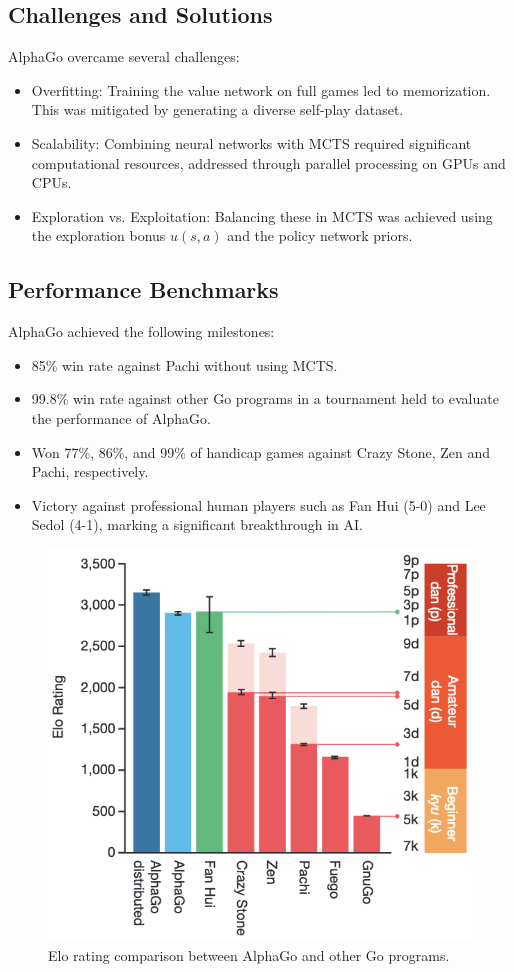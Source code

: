 \subsection{Challenges and Solutions}
AlphaGo overcame several challenges:
\begin{itemize}
    \item Overfitting: Training the value network on full games led to memorization. This
          was mitigated by generating a diverse self-play dataset.
    \item Scalability: Combining neural networks with MCTS required significant
          computational resources, addressed through parallel processing on GPUs and
          CPUs.
    \item Exploration vs. Exploitation: Balancing these in MCTS was achieved using the
          exploration bonus \( u(s, a) \) and the policy network priors.
\end{itemize}

\subsection{Performance Benchmarks}
AlphaGo achieved the following milestones:
\begin{itemize}
    \item 85\% win rate against Pachi without using MCTS.
    \item 99.8\% win rate against other Go programs in a tournament held to evaluate the performance of AlphaGo.
    \item Won 77\%, 86\%, and 99\% of handicap games against Crazy Stone, Zen and Pachi,
          respectively.
    \item Victory against professional human players such as Fan Hui (5-0) and Lee Sedol
          (4-1), marking a significant breakthrough in AI.
\end{itemize}

\begin{figure}[htbp]
    \centering
    \includegraphics[width=\linewidth, height=0.2\textheight, keepaspectratio]{comparison.png}
    \caption{Elo rating comparison between AlphaGo and other Go programs.}
\end{figure}
